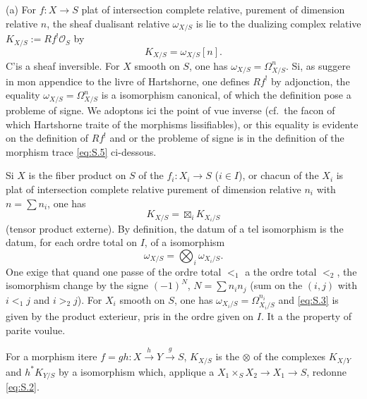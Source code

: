 \documentclass[12pt,a4paper]{article}
\theoremstyle{plain}
\theoremstyle{definition}
\theoremstyle{remark}
\newcommand{\OO}{\mathcal{O}}
\begin{document}
(a) For $f:X\to S$ plat of intersection complete relative, purement of dimension
relative $n$, the sheaf dualisant relative $\omega_{X/S}$ is lie to the dualizing complex
relative $K_{X/S}:=Rf^!\OO_S$ by
\begin{equation}\label{eq:S.1}
K_{X/S}=\omega_{X/S}[n].
\end{equation}
C'is a sheaf inversible. For $X$ smooth on $S$, one has
$\omega_{X/S}=\Omega^n_{X/S}$. Si, as suggere in mon appendice to the livre of
Hartshorne, one defines $Rf^!$ by adjonction, the equality
$\omega_{X/S}=\Omega^n_{X/S}$ is a isomorphism canonical, of which the definition pose
a probleme of signe. We adoptons ici the point of vue inverse (cf.\ the facon
of which Hartshorne traite of the morphisms lissifiables), or this equality is evidente
on the definition of $Rf^!$ and or the probleme of signe is in the definition of the morphism
trace \eqref{eq:S.5} ci-dessous.

Si $X$ is the fiber product on $S$ of the $f_i:X_i\to S$ ($i\in I$), or chacun of the $X_i$
is plat of intersection complete relative purement of dimension relative $n_i$ with
$n=\sum n_i$, one has
\begin{equation}\label{eq:S.2}
K_{X/S}=\boxtimes_i K_{X_i/S}
\end{equation}
(tensor product externe). By definition, the datum of a tel isomorphism is
the datum, for each ordre total on $I$, of a isomorphism
\begin{equation}\label{eq:S.3}
\omega_{X/S}=\bigotimes_i \omega_{X_i/S}.
\end{equation}
One exige that quand one passe of the ordre total $<_1$ a the ordre total $<_2$, the isomorphism
change by the signe $(-1)^N$, $N=\sum n_in_j$ (sum on the $(i,j)$ with $i<_1 j$
and $i>_2 j$). For $X_i$ smooth on $S$, one has $\omega_{X_i/S}=\Omega^{n_i}_{X_i/S}$ and \eqref{eq:S.3}
is given by the product exterieur, pris in the ordre given on $I$. It a the property of
parite voulue.

For a morphism itere $f=gh:X\xrightarrow{h}Y\xrightarrow{g}S$, $K_{X/S}$ is the
$\otimes$ of the complexes $K_{X/Y}$ and $h^*K_{Y/S}$ by a isomorphism which, applique a
$X_1\times_S X_2\to X_1\to S$, redonne \eqref{eq:S.2}.
\end{document}

